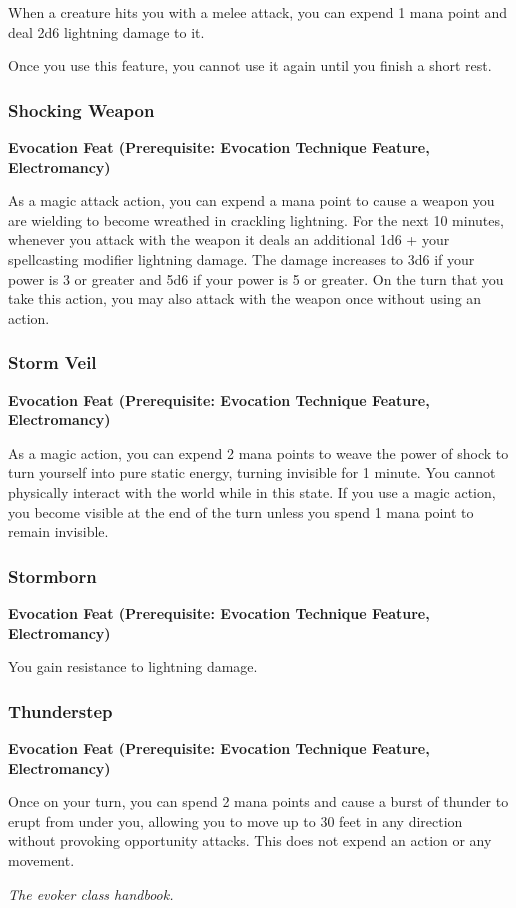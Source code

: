 \documentclass[12pt,letterpaper,twocolumn,openany,nodeprecatedcode,bg=none]{dndbook}
\begin{document}
When a creature hits you with a melee attack, you can expend 1 mana
point and deal 2d6 lightning damage to it.

Once you use this feature, you cannot use it again until you finish a
short rest.

\subsubsection{Shocking Weapon}\label{shocking-weapon}

\textbf{Evocation Feat (Prerequisite: Evocation Technique Feature,
Electromancy)}

As a magic attack action, you can expend a mana point to cause a weapon
you are wielding to become wreathed in crackling lightning. For the next
10 minutes, whenever you attack with the weapon it deals an additional
1d6 + your spellcasting modifier lightning damage. The damage increases
to 3d6 if your power is 3 or greater and 5d6 if your power is 5 or
greater. On the turn that you take this action, you may also attack with
the weapon once without using an action.

\subsubsection{Storm Veil}\label{storm-veil}

\textbf{Evocation Feat (Prerequisite: Evocation Technique Feature,
Electromancy)}

As a magic action, you can expend 2 mana points to weave the power of
shock to turn yourself into pure static energy, turning invisible for 1
minute. You cannot physically interact with the world while in this
state. If you use a magic action, you become visible at the end of the
turn unless you spend 1 mana point to remain invisible.

\subsubsection{Stormborn}\label{stormborn}

\textbf{Evocation Feat (Prerequisite: Evocation Technique Feature,
Electromancy)}

You gain resistance to lightning damage.

\subsubsection{Thunderstep}\label{thunderstep}

\textbf{Evocation Feat (Prerequisite: Evocation Technique Feature,
Electromancy)}

Once on your turn, you can spend 2 mana points and cause a burst of
thunder to erupt from under you, allowing you to move up to 30 feet in
any direction without provoking opportunity attacks. This does not
expend an action or any movement.

\clearpage

\emph{The evoker class handbook.}
\end{document}
